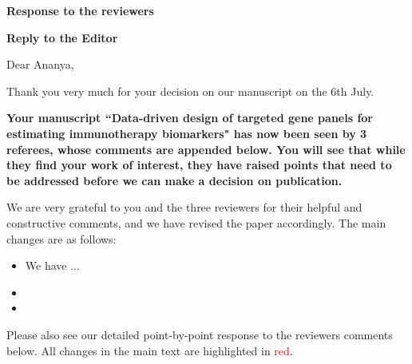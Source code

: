 \documentclass[12pt]{article}
\newcommand{\vtwo}[1]{\textcolor{red}{#1}}
\begin{document}
\begin{center}
\Large{\textbf{Response to the reviewers}}
\end{center}

\vspace{0.2in}

{\large \textbf{Reply to the Editor}}

Dear Ananya,

Thank you very much for your decision on our manuscript on the 6th July.

\textbf{Your manuscript ``Data-driven design of targeted gene panels for estimating immunotherapy biomarkers" has now been seen by 3 referees, whose comments are appended below. You will see that while they find your work of interest, they have raised points that need to be addressed before we can make a decision on publication. }

We are very grateful to you and the three reviewers for their helpful and constructive comments, and we have revised the paper accordingly.  The main changes are as follows: 
\begin{itemize}
    \item We have  ... 
    \item {} 
    \item {} 
\end{itemize}
Please also see our detailed point-by-point response to the reviewers comments below.  All changes in the main text are highlighted in \vtwo{red}.

\end{document}
